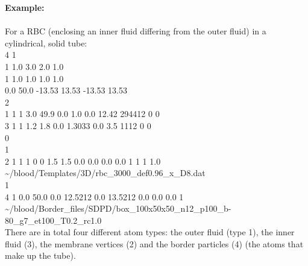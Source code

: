 \textbf{Example:}\\ \\
For a RBC (enclosing an inner fluid differing from the outer fluid) in a cylindrical, solid tube:\\
4 1\\
1 1.0 3.0 2.0 1.0\\
1 1.0 1.0 1.0 1.0\\
0.0 50.0 -13.53 13.53 -13.53 13.53\\
2\\
1 1 1 3.0 49.9 0.0 1.0 0.0 12.42 294412 0 0\\
3 1 1 1.2 1.8 0.0 1.3033 0.0 3.5 1112 0 0\\
0\\
1\\
2 1 1 1 0 0 1.5 1.5 0.0 0.0 0.0 0.0 1 1 1 1.0 \~{}/blood/Templates/3D/rbc\_3000\_def0.96\_x\_D8.dat\\
1\\
4 1 0.0 50.0 0.0 12.5212 0.0 13.5212 0.0 0.0 0.0 1 \~{}/blood/Border\_files/SDPD/box\_100x50x50\_n12\_p100\_b-80\_g7\_et100\_T0.2\_rc1.0\\

There are in total four different atom types: the outer fluid (type 1), the inner fluid (3), the membrane vertices (2) and the border particles (4) (the atoms that make up the tube).\\

